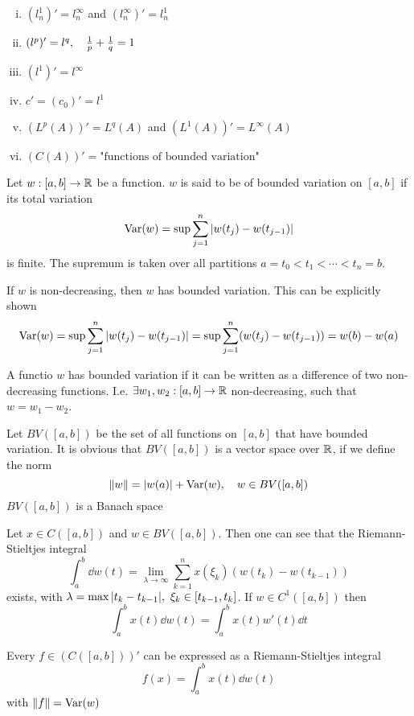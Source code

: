 \documentclass[../../script.tex]{subfiles}
\begin{document}
\begin{eg}
\begin{enumerate}[(i)]
        \item $(l_n^1)' = l_n^{\infty}$ and $(l_n^{\infty})' = l_n^1$
        \item $(l^p)' = l^q, \quad \frac{1}{p} + \frac{1}{q} = 1$
        \item $(l^1)' = l^{\infty}$
        \item $c' = (c_0)' = l^1$
        \item $(L^p(A))' = L^q(A)$ and $(L^1(A))' = L^{\infty}(A)$
        \item $(C(A))' = \text{"functions of bounded variation"}$
    \end{enumerate}
\end{eg}

\begin{defi}
    Let $w: [a, b] \rightarrow \mathbb{R}$ be a function. $w$ is said to be of bounded variation on $[a, b]$ if its total variation 
    \[
        \operatorname{Var}(w) = \sup \sum_{j=1}^n \abs{w(t_j) - w(t_{j-1})}
    \]
    is finite. The supremum is taken over all partitions $a = t_0 < t_1 < \cdots < t_n = b$.
\end{defi}

\begin{eg}
    If $w$ is non-decreasing, then $w$ has bounded variation. This can be explicitly shown 
    \[
        \operatorname{Var}(w) = \sup \sum_{j=1}^n \abs{w(t_j) - w(t_{j-1})} = \sup \sum_{j=1}^n (w(t_j) - w(t_{j-1})) = w(b) - w(a)
    \]
\end{eg}

\begin{rem}
    A functio $w$ has bounded variation if it can be written as a difference of two non-decreasing functions. I.e. $\exists w_1, w_2: [a, b] \rightarrow \mathbb{R}$ non-decreasing, such that $w = w_1 - w_2$.
\end{rem}

\begin{lem}
    Let $BV([a, b])$ be the set of all functions on $[a, b]$ that have bounded variation. It is obvious that $BV([a, b])$ is a vector space over $\mathbb{R}$, if we define the norm
    \[
        \norm{w} = \abs{w(a)} + \operatorname{Var}(w), \quad w \in BV([a, b])
    \]
    $BV([a, b])$ is a Banach space 
\end{lem}  

\begin{rem}
    Let $x \in C([a, b])$ and $w \in BV([a, b])$. Then one can see that the Riemann-Stieltjes integral 
    \[
        \int_a^b \dd{w(t)} = \lim_{\lambda \rightarrow \infty} \sum_{k=1}^{n} x(\xi_k)(w(t_k) - w(t_{k-1}))
    \]
    exists, with $\lambda = \max\abs{t_k - t_{k-1}}, ~\xi_k \in [t_{k-1}, t_k]$. If $w \in C^1([a, b])$ then 
    \[
        \int_a^b x(t) \dd{w(t)} = \int_a^b x(t)w'(t) \dd{t}
    \]
\end{rem}

\begin{thm}
    Every $f \in (C([a, b]))'$ can be expressed as a Riemann-Stieltjes integral 
    \[
        f(x) = \int_a^b x(t) \dd{w(t)}
    \]
    with $\norm{f} = \operatorname{Var}(w)$
\end{thm}
\end{document}
